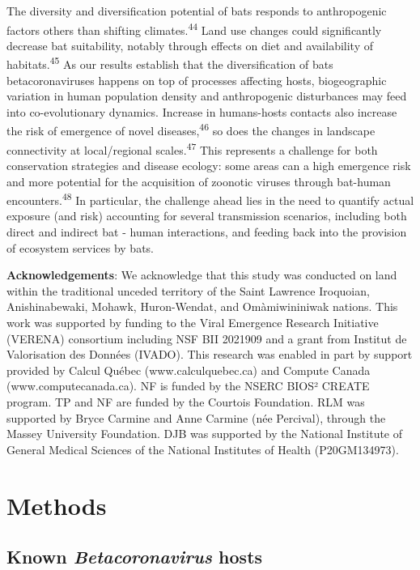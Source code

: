 \documentclass[11pt]{article}
\begin{document}
The diversity and diversification potential of bats responds to
anthropogenic factors others than shifting climates.\textsuperscript{44}
Land use changes could significantly decrease bat suitability, notably
through effects on diet and availability of
habitats.\textsuperscript{45} As our results establish that the
diversification of bats betacoronaviruses happens on top of processes
affecting hosts, biogeographic variation in human population density and
anthropogenic disturbances may feed into co-evolutionary dynamics.
Increase in humans-hosts contacts also increase the risk of emergence of
novel diseases,\textsuperscript{46} so does the changes in landscape
connectivity at local/regional scales.\textsuperscript{47} This
represents a challenge for both conservation strategies and disease
ecology: some areas can a high emergence risk and more potential for the
acquisition of zoonotic viruses through bat-human
encounters.\textsuperscript{48} In particular, the challenge ahead lies
in the need to quantify actual exposure (and risk) accounting for
several transmission scenarios, including both direct and indirect bat -
human interactions, and feeding back into the provision of ecosystem
services by bats.

\textbf{Acknowledgements}: We acknowledge that this study was conducted
on land within the traditional unceded territory of the Saint Lawrence
Iroquoian, Anishinabewaki, Mohawk, Huron-Wendat, and Omàmiwininiwak
nations. This work was supported by funding to the Viral Emergence
Research Initiative (VERENA) consortium including NSF BII 2021909 and a
grant from Institut de Valorisation des Données (IVADO). This research
was enabled in part by support provided by Calcul Québec
(www.calculquebec.ca) and Compute Canada (www.computecanada.ca). NF is
funded by the NSERC BIOS² CREATE program. TP and NF are funded by the
Courtois Foundation. RLM was supported by Bryce Carmine and Anne Carmine
(née Percival), through the Massey University Foundation. DJB was
supported by the National Institute of General Medical Sciences of the
National Institutes of Health (P20GM134973).

\newpage

\hypertarget{methods}{%
\section{Methods}\label{methods}}

\hypertarget{known-betacoronavirus-hosts}{%
\subsection{\texorpdfstring{Known \emph{Betacoronavirus}
hosts}{Known Betacoronavirus hosts}}\label{known-betacoronavirus-hosts}}
\end{document}
